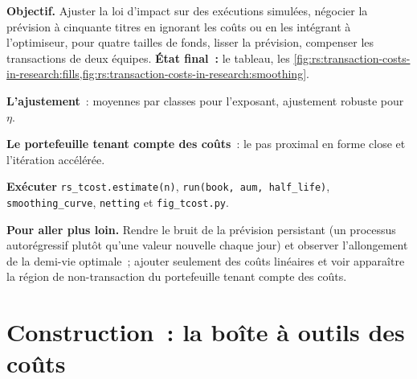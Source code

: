 \begin{tutorial}
\textbf{Objectif.} Ajuster la loi d'impact sur des exécutions simulées, négocier la prévision à cinquante titres en ignorant les coûts ou en les intégrant à l'optimiseur, pour quatre tailles de fonds, lisser la
prévision, compenser les transactions de deux équipes. \textbf{État final~:} le tableau, les \cref{fig:rs:transaction-costs-in-research:fills,fig:rs:transaction-costs-in-research:smoothing}.
\begin{tutsteps}
\item \textbf{L'ajustement}~: moyennes par classes pour l'exposant, ajustement robuste pour $\eta$.
\label{lst:rs:transaction-costs-in-research:fit}
\item \textbf{Le portefeuille tenant compte des coûts}~: le pas proximal en forme close et l'itération accélérée.
\label{lst:rs:transaction-costs-in-research:aware}
\item \textbf{Exécuter} \texttt{rs\_tcost.estimate(n)}, \texttt{run(book, aum, half\_life)}, \texttt{smoothing\_curve}, \texttt{netting} et \texttt{fig\_tcost.py}.
\end{tutsteps}
\textbf{Pour aller plus loin.} Rendre le bruit de la prévision persistant (un processus autorégressif plutôt qu'une valeur nouvelle chaque jour) et observer l'allongement de la demi-vie optimale~; ajouter
seulement des coûts linéaires et voir apparaître la région de non-transaction du portefeuille tenant compte des coûts.
\end{tutorial}

\section{Construction~: la boîte à outils des coûts}\label{bld:rs:transaction-costs-in-research:tcost}

